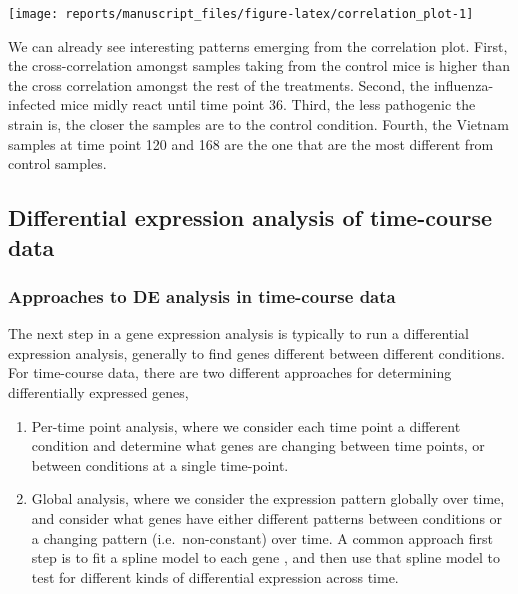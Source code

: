 \documentclass[9pt,a4paper,]{extarticle}
\begin{document}
\begin{center}\texttt{[image: reports/manuscript\_files/figure-latex/correlation\_plot-1]} \end{center}

We can already see interesting patterns emerging from the correlation plot.
First, the cross-correlation amongst samples taking from the control mice is
higher than the cross correlation amongst the rest of the treatments. Second,
the influenza-infected mice midly react until time point 36. Third, the less
pathogenic the strain is, the closer the samples are to the control condition.
Fourth, the Vietnam samples at time point 120 and 168 are the one that are the
most different from control samples.

\hypertarget{differential-expression-analysis-of-time-course-data}{%
\subsection{Differential expression analysis of time-course data}\label{differential-expression-analysis-of-time-course-data}}

\hypertarget{approaches-to-de-analysis-in-time-course-data}{%
\subsubsection{Approaches to DE analysis in time-course data}\label{approaches-to-de-analysis-in-time-course-data}}

The next step in a gene expression analysis is typically to run a differential
expression analysis, generally to find genes different between different
conditions. For time-course data, there are two different approaches for
determining differentially expressed genes,

\begin{enumerate}
\def\labelenumi{\arabic{enumi})}
\item
  Per-time point analysis, where we consider each time point a different
  condition and determine what genes are changing between time points, or
  between conditions at a single time-point.
\item
  Global analysis, where we consider the expression pattern globally over
  time, and consider what genes have either different patterns between
  conditions or a changing pattern (i.e.~non-constant) over time. A common
  approach first step is to fit a spline model to each gene
  \citep{storey:significance},
  and then use that spline model to test for different kinds of differential
  expression across time.
\end{enumerate}
\end{document}
